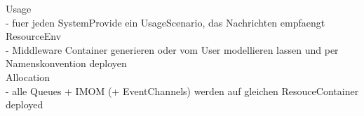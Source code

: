 Usage\\
- fuer jeden SystemProvide ein UsageScenario, das Nachrichten empfaengt\\

ResourceEnv\\
- Middleware Container generieren oder vom User modellieren lassen und per Namenskonvention deployen\\

Allocation\\
- alle Queues + IMOM (+ EventChannels) werden auf gleichen ResouceContainer deployed\\